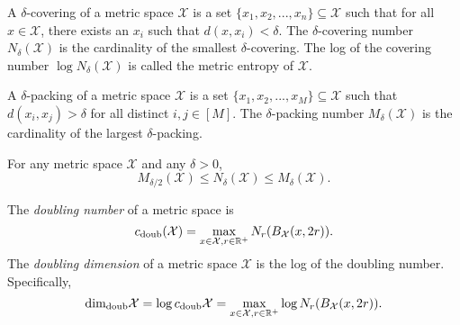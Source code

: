 \documentclass[../main.tex]{subfiles}
\newcommand{\set}[1]{\mathcal {#1}}
\newcommand{\radius}{r}
\newcommand{\dist}[2]{\distf({#1},{#2})}
\newcommand{\distf}{d}
\newcommand{\minkdim}{\text{dim}_\text{Mink}}
\newcommand{\doubdim}{\text{dim}_\text{doub}}
\newcommand{\doubnum}{c_\text{doub}}
\begin{document}

\begin{definition}
    A $\delta$-covering of a metric space $\set X$ is a set $\{x_1,x_2,...,x_n\} \subseteq \set X$ such that for all $x\in\set X$, there exists an $x_i$ such that $\dist{x}{x_i} < \delta$.
    The $\delta$-covering number $N_\delta(\set X)$ is the cardinality of the smallest $\delta$-covering.
    The log of the covering number $\log N_\delta(\set X)$ is called the metric entropy of $\set X$.
\end{definition}

\begin{definition}
A $\delta$-packing of a metric space $\set X$ is a set $\{x_1,x_2,...,x_M\} \subseteq \set X$ such that $\dist{x_i}{x_j} > \delta$ for all distinct $i,j\in[M]$.
The $\delta$-packing number $M_\delta (\set X)$ is the cardinality of the largest $\delta$-packing.
\end{definition}

\begin{lemma}
    \label{lemma:coverpacking}
    For any metric space $\set X$ and any $\delta>0$,
    \begin{equation}
        M_{\delta/2}(\set X) \le N_\delta(\set X) \le M_{\delta}(\set X)
        .
    \end{equation}
\end{lemma}

%

%

\begin{definition}
    The \emph{doubling number} of a metric space is
    \begin{equation}
        \doubnum(\set X) = \max_{x\in\set X, \radius\in\R^+} N_\radius(B_{\set X}(x,2\radius))
        .
    \end{equation}
    The \emph{doubling dimension} of a metric space $\set X$ is the log of the doubling number.
    Specifically,
    \begin{equation}
        \doubdim \set X = \log \doubnum\set X = \max_{x\in\set X, \radius\in\R^+} \log N_\radius(B_{\set X}(x,2\radius))
        .
    \end{equation}
\end{definition}
\cite{gupta2003bounded}
\end{document}
